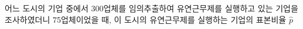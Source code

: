 어느 도시의 기업 중에서 300업체를 임의추출하여 유연근무제를 실행하고 있는 기업을 조사하였더니 75업체이었을 때, 이 도시의 유연근무제를 실행하는 기업의 표본비율 $\hat{p}$
